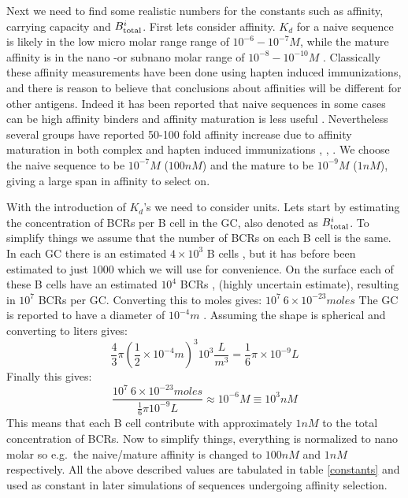 Next we need to find some realistic numbers for the constants such as affinity, carrying capacity and $B^i_{\text{total}}$.
First lets consider affinity.
$K_d$ for a naive sequence is likely in the low micro molar range range of $10^{-6} - 10^{-7} M$, while the mature affinity is in the nano -or subnano molar range of $10^{-8} - 10^{-10} M$ \cite{berek1987mutation}.
Classically these affinity measurements have been done using hapten induced immunizations, and there is reason to believe that conclusions about affinities will be different for other antigens.
Indeed it has been reported that naive sequences in some cases can be high affinity binders and affinity maturation is less useful \cite{frank2015simple}.
Nevertheless several groups have reported 50-100 fold affinity increase due to affinity maturation in both complex and hapten induced immunizations \cite{Kelsoe_2016}, \cite{phan2006high}, \cite{ulrich1997interplay}.
We choose the naive sequence to be $10^{-7} M$ ($100nM$) and the mature to be $10^{-9} M$ ($1nM$), giving a large span in affinity to select on.


With the introduction of $K_d$'s we need to consider units.
Lets start by estimating the concentration of BCRs per B cell in the GC, also denoted as $B^i_{\text{total}}$.
To simplify things we assume that the number of BCRs on each B cell is the same.
In each GC there is an estimated $4 \times 10^3$ B cells \cite{kroese1990germinal}, but it has before been estimated to just $1000$ \cite{Childs_Baskerville_Cobey_2015} which we will use for convenience.
On the surface each of these B cells have an estimated $10^4$ BCRs \cite{rieckmann2017social}, \cite{immprot} (highly uncertain estimate), resulting in $10^7$ BCRs per GC.
Converting this to moles gives: $10^7\ 6 \times 10^{-23} moles$
The GC is reported to have a diameter of $10^{-4} m$ \cite{Romppanen_1981}.
Assuming the shape is spherical and converting to liters gives:
$$
\frac{4}{3} \pi (\frac{1}{2} \times 10^{-4} m)^3 10^3 \frac{L}{m^3} = \frac{1}{6} \pi \times 10^{-9} L
$$
Finally this gives:
$$\frac{10^7\ 6 \times 10^{-23} moles}{\frac{1}{6} \pi 10^{-9} L} \approx 10^{-6} M \equiv 10^{3} nM
$$
This means that each B cell contribute with approximately $1nM$ to the total concentration of BCRs.
Now to simplify things, everything is normalized to nano molar so e.g.\ the naive/mature affinity is changed to $100nM$ and $1nM$ respectively.
All the above described values are tabulated in table \ref{constants} and used as constant in later simulations of sequences undergoing affinity selection.

